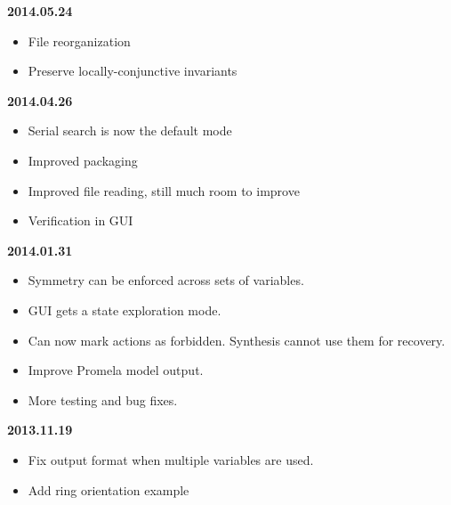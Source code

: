 \textbf{2014.05.24}
\begin{itemize}
\item File reorganization
\item Preserve locally-conjunctive invariants
\end{itemize}
\textbf{2014.04.26}
\begin{itemize}
\item Serial search is now the default mode
\item Improved packaging
\item Improved file reading, still much room to improve
\item Verification in GUI
\end{itemize}
\textbf{2014.01.31}
\begin{itemize}
\item Symmetry can be enforced across sets of variables.
\item GUI gets a state exploration mode.
\item Can now mark actions as forbidden. Synthesis cannot use them for recovery.
\item Improve Promela model output.
\item More testing and bug fixes.
\end{itemize}
\textbf{2013.11.19}
\begin{itemize}
\item Fix output format when multiple variables are used.
\item Add ring orientation example
\end{itemize}

